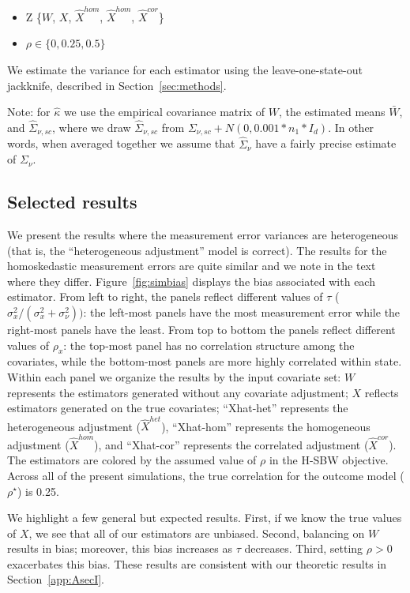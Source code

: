 \begin{itemize}
    \item Z \in \{$W$, $X$, $\hat{X}^{hom}$, $\hat{X}^{hom}$, $\hat{X}^{cor}$\}
    \item $\rho \in \{0, 0.25, 0.5\}$
\end{itemize}

We estimate the variance for each estimator using the leave-one-state-out jackknife, described in Section~\ref{sec:methods}. 

Note: for $\hat{\kappa}$ we use the empirical covariance matrix of $W$, the estimated means $\bar{W}$, and $\hat{\Sigma}_{\nu, sc}$, where we draw $\hat{\Sigma}_{\nu, sc}$ from $\Sigma_{\nu, sc} + N(0, 0.001*n_1*I_d)$. In other words, when averaged together we assume that $\hat{\Sigma}_{\nu}$ have a fairly precise estimate of $\Sigma_{\nu}$.

\subsection{Selected results}

We present the results where the measurement error variances are heterogeneous (that is, the ``heterogeneous adjustment'' model is correct). The results for the homoskedastic measurement errors are quite similar and we note in the text where they differ. Figure~\ref{fig:simbias} displays the bias associated with each estimator. From left to right, the panels reflect different values of $\tau$ ($\sigma^2_x/(\sigma^2_x + \sigma^2_{\nu}))$: the left-most panels have the most measurement error while the right-most panels have the least. From top to bottom the panels reflect different values of $\rho_x$: the top-most panel has no correlation structure among the covariates, while the bottom-most panels are more highly correlated within state. Within each panel we organize the results by the input covariate set: $W$ represents the estimators generated without any covariate adjustment; $X$ reflects estimators generated on the true covariates; ``Xhat-het'' represents the heterogeneous adjustment ($\hat{X}^{het}$), ``Xhat-hom'' represents the homogeneous adjustment ($\hat{X}^{hom}$), and ``Xhat-cor'' represents the correlated adjustment ($\hat{X}^{cor}$). The estimators are colored by the assumed value of $\rho$ in the H-SBW objective. Across all of the present simulations, the true correlation for the outcome model ($\rho^\star$) is 0.25.

We highlight a few general but expected results. First, if we know the true values of $X$, we see that all of our estimators are unbiased. Second, balancing on $W$ results in bias; moreover, this bias increases as $\tau$ decreases. Third, setting $\rho > 0$ exacerbates this bias. These results are consistent with our theoretic results in Section~\ref{app:AsecI}.

